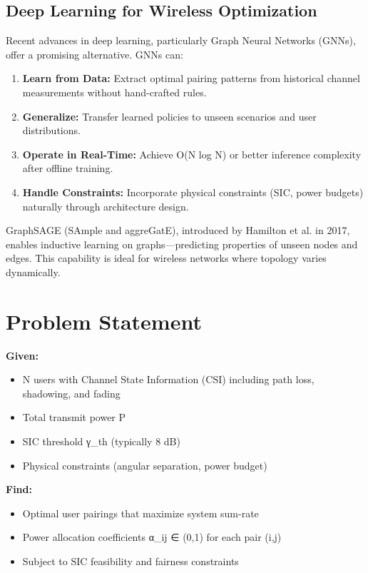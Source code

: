 \subsection{Deep Learning for Wireless Optimization}

Recent advances in deep learning, particularly Graph Neural Networks (GNNs), offer a promising alternative. GNNs can:
\begin{enumerate}
    \item \textbf{Learn from Data:} Extract optimal pairing patterns from historical channel measurements without hand-crafted rules.
    \item \textbf{Generalize:} Transfer learned policies to unseen scenarios and user distributions.
    \item \textbf{Operate in Real-Time:} Achieve O(N log N) or better inference complexity after offline training.
    \item \textbf{Handle Constraints:} Incorporate physical constraints (SIC, power budgets) naturally through architecture design.
\end{enumerate}

GraphSAGE (SAmple and aggreGatE), introduced by Hamilton et al. in 2017, enables inductive learning on graphs—predicting properties of unseen nodes and edges. This capability is ideal for wireless networks where topology varies dynamically.

\section{Problem Statement}

\textbf{Given:}
\begin{itemize}
    \item N users with Channel State Information (CSI) including path loss, shadowing, and fading
    \item Total transmit power P
    \item SIC threshold γ\_th (typically 8 dB)
    \item Physical constraints (angular separation, power budget)
\end{itemize}

\textbf{Find:}
\begin{itemize}
    \item Optimal user pairings that maximize system sum-rate
    \item Power allocation coefficients α\_ij ∈ (0,1) for each pair (i,j)
    \item Subject to SIC feasibility and fairness constraints
\end{itemize}

